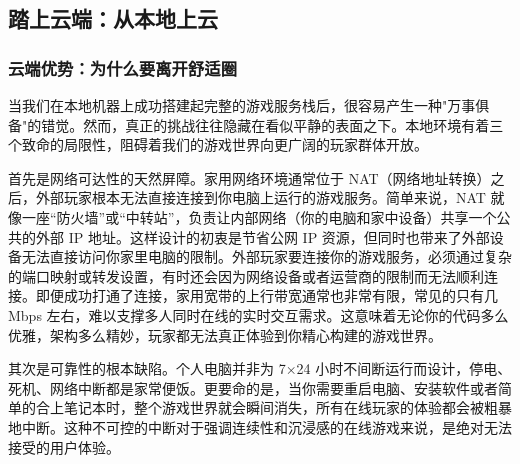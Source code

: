 
\subsection{踏上云端：从本地上云} %

\subsubsection{云端优势：为什么要离开舒适圈}

当我们在本地机器上成功搭建起完整的游戏服务栈后，很容易产生一种"万事俱备"的错觉。然而，真正的挑战往往隐藏在看似平静的表面之下。本地环境有着三个致命的局限性，阻碍着我们的游戏世界向更广阔的玩家群体开放。

首先是网络可达性的天然屏障。家用网络环境通常位于 NAT（网络地址转换）之后，外部玩家根本无法直接连接到你电脑上运行的游戏服务。简单来说，NAT 就像一座“防火墙”或“中转站”，负责让内部网络（你的电脑和家中设备）共享一个公共的外部 IP 地址。这样设计的初衷是节省公网 IP 资源，但同时也带来了外部设备无法直接访问你家里电脑的限制。外部玩家要连接你的游戏服务，必须通过复杂的端口映射或转发设置，有时还会因为网络设备或者运营商的限制而无法顺利连接。即便成功打通了连接，家用宽带的上行带宽通常也非常有限，常见的只有几 Mbps 左右，难以支撑多人同时在线的实时交互需求。这意味着无论你的代码多么优雅，架构多么精妙，玩家都无法真正体验到你精心构建的游戏世界。

其次是可靠性的根本缺陷。个人电脑并非为 7×24 小时不间断运行而设计，停电、死机、网络中断都是家常便饭。更要命的是，当你需要重启电脑、安装软件或者简单的合上笔记本时，整个游戏世界就会瞬间消失，所有在线玩家的体验都会被粗暴地中断。这种不可控的中断对于强调连续性和沉浸感的在线游戏来说，是绝对无法接受的用户体验。

